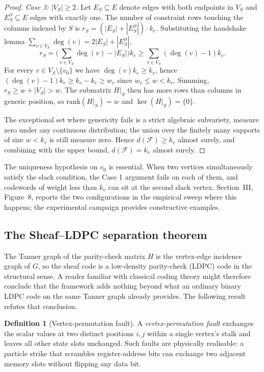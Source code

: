 \documentclass[12pt,a4paper]{article}
\theoremstyle{plain}
\theoremstyle{definition}
\newtheorem{definition}{Definition}
\begin{document}
\begin{proof}
\textit{Case 3: $|V_S| \geq 2$.} Let $E_S \subseteq E$ denote edges with both endpoints in $V_S$ and $E_S^\partial \subseteq E$ edges with exactly one. The number of constraint rows touching the columns indexed by $S$ is $r_S = (|E_S| + |E_S^\partial|) \cdot k_e$. Substituting the handshake lemma $\sum_{v \in V_S} \deg(v) = 2|E_S| + |E_S^\partial|$,
\[
r_S = \Big(\sum_{v \in V_S} \deg(v) - |E_S|\Big) k_e \geq \sum_{v \in V_S} (\deg(v) - 1) k_e.
\]
For every $v \in V_S \setminus \{v_0\}$ we have $\deg(v) k_e \geq k_v$, hence $(\deg(v) - 1) k_e \geq k_v - k_e \geq w_v$ since $w_v \leq w < k_v$. Summing, $r_S \geq w + |V_S| > w$. The submatrix $H|_S$ then has more rows than columns in generic position, so $\mathrm{rank}(H|_S) = w$ and $\ker(H|_S) = \{0\}$.

The exceptional set where genericity fails is a strict algebraic subvariety, measure zero under any continuous distribution; the union over the finitely many supports of size $w < k_v$ is still measure zero. Hence $d(\mathcal{F}) \geq k_v$ almost surely, and combining with the upper bound, $d(\mathcal{F}) = k_v$ almost surely.
\end{proof}

The uniqueness hypothesis on $v_0$ is essential. When two vertices simultaneously satisfy the slack condition, the Case 1 argument fails on each of them, and codewords of weight less than $k_v$ can sit at the second slack vertex. Section~III, Figure~8, reports the two configurations in the empirical sweep where this happens; the experimental campaign provides constructive examples.

\subsection{The Sheaf--LDPC separation theorem}

The Tanner graph of the parity-check matrix $H$ is the vertex-edge incidence graph of $G$, so the sheaf code is a low-density parity-check (LDPC) code in the structural sense. A reader familiar with classical coding theory might therefore conclude that the framework adds nothing beyond what an ordinary binary LDPC code on the same Tanner graph already provides. The following result refutes that conclusion.

\begin{definition}[Vertex-permutation fault]
A \textit{vertex-permutation fault} exchanges the scalar values at two distinct positions $i, j$ within a single vertex's stalk and leaves all other state slots unchanged. Such faults are physically realisable: a particle strike that scrambles register-address bits can exchange two adjacent memory slots without flipping any data bit.
\end{definition}
\end{document}
